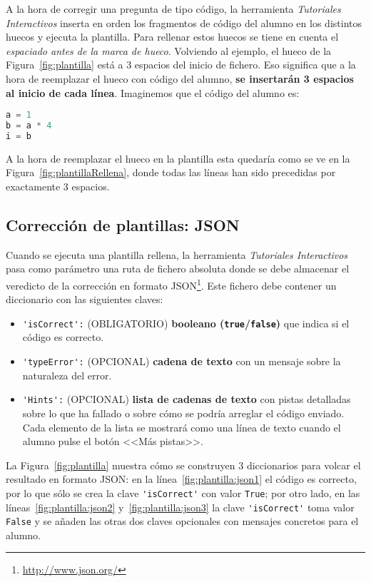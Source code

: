 \documentclass[]{article}
\newcommand{\code}[1]{{\lstinline[basicstyle=\ttfamily,mathescape]!#1!}}
\newcommand{\toolname}{\emph{Tutoriales Interactivos}}
\begin{document}
A la hora de corregir una pregunta de tipo código, la herramienta \toolname{} inserta en orden los fragmentos de código del alumno en los distintos huecos y ejecuta la plantilla. Para rellenar estos huecos se tiene en cuenta el \emph{espaciado antes de la marca de hueco}. Volviendo al ejemplo, el hueco de la Figura~\ref{fig:plantilla} está a 3 espacios del inicio de fichero. Eso significa que a la hora de reemplazar el hueco con código del alumno, \textbf{se insertarán 3 espacios al inicio de cada línea}. Imaginemos que el código del alumno es:
\begin{lstlisting}[language=Python,basicstyle=\ttfamily, otherkeywords={with}]
a = 1
b = a * 4
i = b
\end{lstlisting}
A la hora de reemplazar el hueco en la plantilla esta quedaría como se ve en la Figura~\ref{fig:plantillaRellena}, donde todas las líneas han sido precedidas por exactamente 3 espacios.

\subsection{Corrección de plantillas: JSON}
Cuando se ejecuta una plantilla rellena, la herramienta \toolname{} pasa como parámetro una ruta de fichero absoluta donde se debe almacenar el veredicto de la corrección en formato JSON\footnote{\url{http://www.json.org/}}. Este fichero debe contener un diccionario con las siguientes claves:
\begin{itemize}
	\item \code{'isCorrect':} {\sf (OBLIGATORIO)} \textbf{booleano (\code{true}/\code{false})} que indica si el código es correcto.
	\item \code{'typeError':} {\sf (OPCIONAL)} \textbf{cadena de texto} con un mensaje sobre la naturaleza del error. 
	\item \code{'Hints':} {\sf (OPCIONAL)} \textbf{lista de cadenas de texto} con pistas detalladas sobre lo que ha fallado o sobre cómo se podría arreglar el código enviado. Cada elemento de la lista se mostrará como una línea de texto cuando el alumno pulse el botón <<Más pistas>>.
\end{itemize}
La Figura~\ref{fig:plantilla} muestra cómo se construyen 3 diccionarios para volcar el resultado en formato JSON: en la línea~\ref{fig:plantilla:json1} el código es correcto, por lo que sólo se crea la clave \code{'isCorrect'} con valor \code{True}; por otro lado, en las líneas~\ref{fig:plantilla:json2} y~\ref{fig:plantilla:json3} la clave \code{'isCorrect'} toma valor \code{False} y se añaden las otras dos claves opcionales con mensajes concretos para el alumno.
\end{document}
